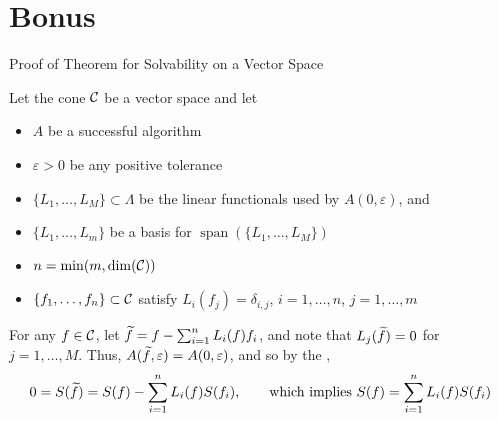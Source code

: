 \documentclass[11pt,compress,xcolor={usenames,dvipsnames},aspectratio=169]{beamer}
\DeclareMathOperator{\spann}{span}
\begin{document}
\section{Bonus}
\begin{frame}[label = VectorSpaceThmProof]{Proof of Theorem for Solvability on a Vector Space}

\vspace{-3ex}

Let the cone $\mathcal{C}$ be a \alert{vector space} and let

\vspace{-3ex}
\begin{itemize}
    \item $A$ be a successful algorithm
    
    \item $\varepsilon > 0$ be any positive tolerance
    
    \item  $\{L_1, \ldots, L_{M}\} \subset \Lambda$ be the linear functionals used by $A(0,\varepsilon)$, and
    
    \item  $\{L_1, \ldots, L_m\}$ be a basis for $\spann(\{L_1, \ldots, L_{M}\})$
    
    \item $n  = \min(m,\dim(\mathcal{C}))$
    
        \item $\{f_1, \ldots, f_n\} \subset \mathcal{C}$ satisfy $L_i(f_j) = \delta_{i,j}$, $i =1, \ldots, n$, $j=1, \ldots, m$
\end{itemize}

\vspace{-2ex}

For any $f \in \mathcal{C}$, let $\widetilde{f} = f- \sum_{i=1}^n L_i(f) f_i$, and note that $L_j(\widetilde{f}) = 0$ for $j =1, \ldots, M$.  Thus, $A(\widetilde{f},\varepsilon) = A(0,\varepsilon)$, and so by the \hyperlink{ZeroCorollary}{},
\[
0 = S(\widetilde{f}) = S(f) - \sum_{i=1}^n L_i(f) S(f_i), \qquad \text{which implies } S(f) = \sum_{i=1}^n L_i(f) S(f_i)
\]

\vspace{-3ex}
    \hyperlink{VectorSpaceThm}{}
\end{frame}
\end{document}
